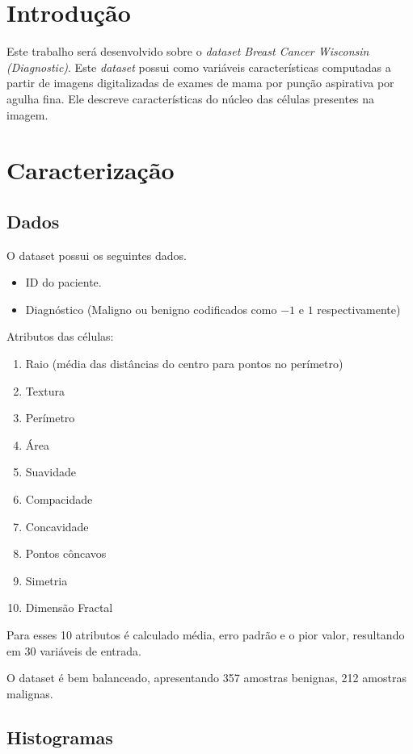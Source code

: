 \documentclass[11pt,a4paper]{article}
\numberwithin{equation}{section}
\begin{document}

\section{Introdução}
Este trabalho será desenvolvido sobre o \textit{dataset Breast Cancer Wisconsin (Diagnostic)}. Este \textit{dataset} possui como variáveis características computadas a partir de imagens digitalizadas de exames de mama por punção aspirativa por agulha fina. Ele descreve características do núcleo das células presentes na imagem. 
\section{Caracterização}

\subsection{Dados}
O dataset possui os seguintes dados.

\begin{itemize}
\item ID do paciente.
\item Diagnóstico (Maligno ou benigno codificados como $-1$ e $1$ respectivamente)
\end{itemize}

Atributos das células:
\begin{enumerate}
\item Raio (média das distâncias do centro para pontos no perímetro)
\item Textura
\item Perímetro
\item Área
\item Suavidade
\item Compacidade
\item Concavidade
\item Pontos côncavos
\item Simetria
\item Dimensão Fractal
\end{enumerate}

Para esses 10 atributos é calculado média, erro padrão e o pior valor, resultando em 30 variáveis de entrada. 

O dataset é bem balanceado, apresentando 357 amostras benignas, 212 amostras malignas.

\subsection{Histogramas}
\end{document}

